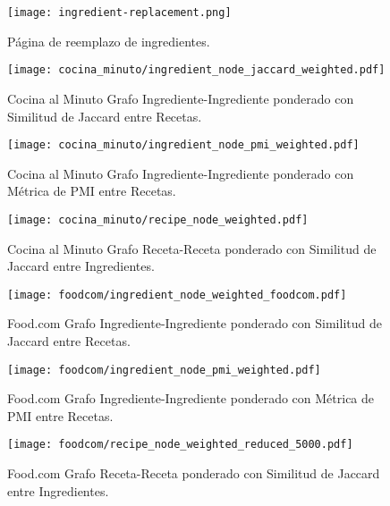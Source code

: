 \documentclass[
	a4paper, %
	10pt, %
	unnumberedsections, %
	twoside, %
]{LTJournalArticle}
\begin{document}
\begin{figure}
	\texttt{[image: ingredient-replacement.png]}
	\caption{Página de reemplazo de ingredientes.}
	\label{fig:ingredient-replacement}
\end{figure}

\begin{figure} %
	\texttt{[image: cocina\_minuto/ingredient\_node\_jaccard\_weighted.pdf]}
	\caption{Cocina al Minuto Grafo Ingrediente-Ingrediente ponderado con Similitud de Jaccard entre Recetas.}
	\label{fig:cocina_minuto_ingredient_jaccard}
\end{figure}

\begin{figure} %
	\texttt{[image: cocina\_minuto/ingredient\_node\_pmi\_weighted.pdf]}
	\caption{Cocina al Minuto Grafo Ingrediente-Ingrediente ponderado con Métrica de PMI entre Recetas.}
	\label{fig:cocina_minuto_ingredient_pmi}
\end{figure}

\begin{figure} %
	\texttt{[image: cocina\_minuto/recipe\_node\_weighted.pdf]}
	\caption{Cocina al Minuto Grafo Receta-Receta ponderado con Similitud de Jaccard entre Ingredientes.}
	\label{fig:cocina_minuto_recipe_jaccard}
\end{figure}


\begin{figure} %
	\texttt{[image: foodcom/ingredient\_node\_weighted\_foodcom.pdf]}
	\caption{Food.com Grafo Ingrediente-Ingrediente ponderado con Similitud de Jaccard entre Recetas.}
	\label{fig:foodcom_ingredient_jaccard}
\end{figure}

\begin{figure} %
	\texttt{[image: foodcom/ingredient\_node\_pmi\_weighted.pdf]}
	\caption{Food.com Grafo Ingrediente-Ingrediente ponderado con Métrica de PMI entre Recetas.}
	\label{fig:foodcom_ingredient_pmi}
\end{figure}

\begin{figure} %
	\texttt{[image: foodcom/recipe\_node\_weighted\_reduced\_5000.pdf]}
	\caption{Food.com Grafo Receta-Receta ponderado con Similitud de Jaccard entre Ingredientes.}
	\label{fig:foodcom_recipe_jaccard}
\end{figure}
\end{document}
